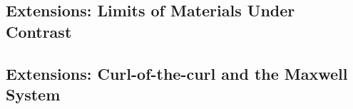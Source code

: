 \subsection{Extensions: Limits of Materials Under Contrast}

\subsection{Extensions: Curl-of-the-curl and the Maxwell System}

%
%
%
